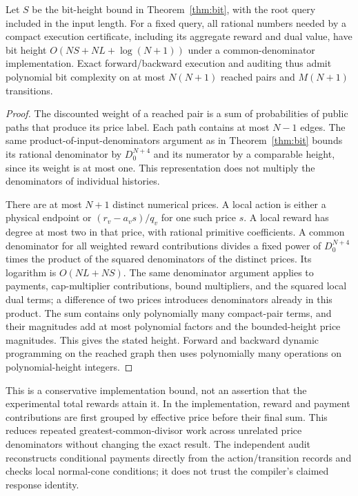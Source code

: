 \begin{proposition}\label{ec:prop-execution-bits}
Let $S$ be the bit-height bound in Theorem~\ref{thm:bit}, with the root query included in the input length. For a fixed query, all rational numbers needed by a compact execution certificate, including its aggregate reward and dual value, have bit height $O(NS+NL+\log(N+1))$ under a common-denominator implementation. Exact forward/backward execution and auditing thus admit polynomial bit complexity on at most $N(N+1)$ reached pairs and $M(N+1)$ transitions.
\end{proposition}
\begin{proof}
The discounted weight of a reached pair is a sum of probabilities of public paths that produce its price label. Each path contains at most $N-1$ edges. The same product-of-input-denominators argument as in Theorem~\ref{thm:bit} bounds its rational denominator by $D_0^{N+4}$ and its numerator by a comparable height, since its weight is at most one. This representation does not multiply the denominators of individual histories.

There are at most $N+1$ distinct numerical prices. A local action is either a physical endpoint or $(r_v-a_vs)/q_v$ for one such price $s$. A local reward has degree at most two in that price, with rational primitive coefficients. A common denominator for all weighted reward contributions divides a fixed power of $D_0^{N+4}$ times the product of the squared denominators of the distinct prices. Its logarithm is $O(NL+NS)$. The same denominator argument applies to payments, cap-multiplier contributions, bound multipliers, and the squared local dual terms; a difference of two prices introduces denominators already in this product. The sum contains only polynomially many compact-pair terms, and their magnitudes add at most polynomial factors and the bounded-height price magnitudes. This gives the stated height. Forward and backward dynamic programming on the reached graph then uses polynomially many operations on polynomial-height integers.\end{proof}

This is a conservative implementation bound, not an assertion that the experimental total rewards attain it. In the implementation, reward and payment contributions are first grouped by effective price before their final sum. This reduces repeated greatest-common-divisor work across unrelated price denominators without changing the exact result. The independent audit reconstructs conditional payments directly from the action/transition records and checks local normal-cone conditions; it does not trust the compiler's claimed response identity.

